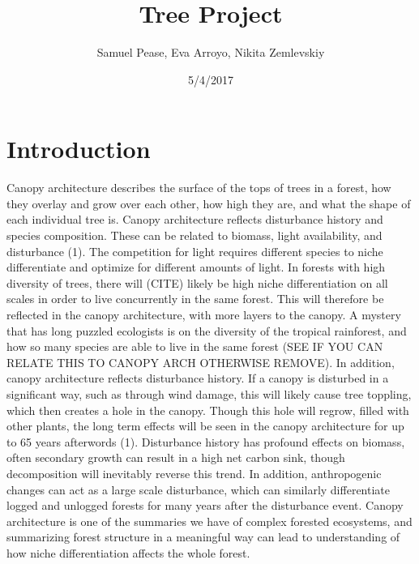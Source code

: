 \documentclass[10pt]{article}
\title{Tree Project}
\author{Samuel Pease, Eva Arroyo, Nikita Zemlevskiy}
\date{5/4/2017}
\begin{document}
\maketitle
\newpage
\section*{Introduction}

\indent Canopy architecture describes the surface of the tops of trees in a forest, how they overlay and grow over each other, how high they are, and what the shape of each individual tree is. Canopy architecture reflects disturbance history and species composition. These can be related to biomass, light availability, and disturbance (1).  The competition for light requires different species to niche differentiate and optimize for different amounts of light. In forests with high diversity of trees, there will (CITE) likely be high niche differentiation on all scales in order to live concurrently in the same forest. This will therefore be reflected in the canopy architecture, with more layers to the canopy. A mystery that has long puzzled ecologists is on the diversity of the tropical rainforest, and how so many species are able to live in the same forest (SEE IF YOU CAN RELATE THIS TO CANOPY ARCH OTHERWISE REMOVE). In addition, canopy architecture reflects disturbance history. If a canopy is disturbed in a significant way, such as through wind damage, this will likely cause tree toppling, which then creates a hole in the canopy. Though this hole will regrow, filled with other plants, the long term effects will be seen in the canopy architecture for up to 65 years afterwords (1). Disturbance history has profound effects on biomass, often secondary growth can result in a high net carbon sink, though decomposition will inevitably reverse this trend. In addition, anthropogenic changes can act as a large scale disturbance, which can similarly differentiate logged and unlogged forests for many years after the disturbance event. Canopy architecture is one of the summaries we have of complex forested ecosystems, and summarizing forest structure in a meaningful way can lead to understanding of how niche differentiation affects the whole forest.
\end{document}
